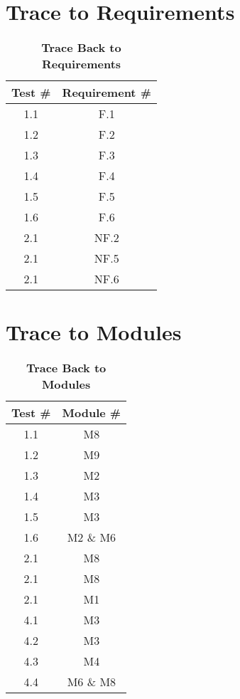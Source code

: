 \documentclass[12pt, titlepage]{article}
\begin{document}
\section{Trace to Requirements}	
	\begin{table}[H]
		\begin{center}
		\setlength{\extrarowheight}{1ex}
		\caption {\bf Trace Back to Requirements}
		\begin{tabularx}{\textwidth}{c|c}
			{\bf Test \#} & {\bf Requirement \#}\\
			\hline
			1.1 & F.1 \\
			1.2 & F.2 \\
			1.3 & F.3 \\
			1.4 & F.4 \\
			1.5 & F.5 \\
			1.6 & F.6 \\
			2.1 & NF.2 \\
			2.1 & NF.5 \\
			2.1 & NF.6 \\
		\end{tabularx}
	\end{center}
	\end{table}
		
\section{Trace to Modules}
	
	\begin{table}[H]	
		\setlength{\extrarowheight}{1ex}
		\caption {\bf Trace Back to Modules}
		\begin{tabularx}{\textwidth}{c|c}
			{\bf Test \#} & {\bf Module \#}\\
			\hline
			1.1 & M8 \\
			1.2 & M9 \\
			1.3 & M2 \\
			1.4 & M3 \\
			1.5 & M3 \\
			1.6 & M2 \& M6 \\
			2.1 & M8 \\
			2.1 & M8 \\
			2.1 & M1 \\
			4.1 & M3 \\
			4.2 & M3 \\
			4.3 & M4 \\
			4.4 & M6 \& M8 \\
		\end{tabularx}
		
	\end{table}
\end{document}
